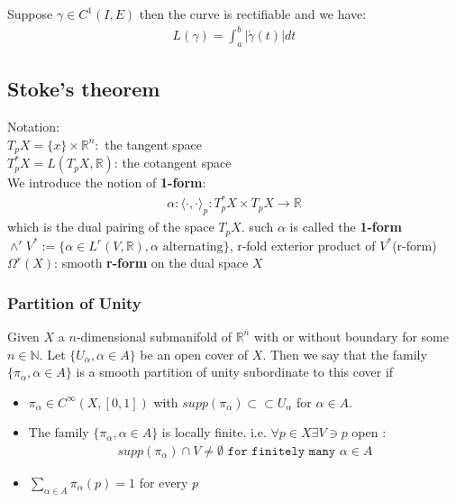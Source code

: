 \begin{theorem}
	Suppose $\gamma \in C^1(I, E)$ then the curve is rectifiable and we have:
	\begin{align*}
		L(\gamma) = \int_a^b |\dot{\gamma}(t)|dt
	\end{align*}
\end{theorem}


\subsection{Stoke's theorem}
Notation:\\
$T_pX = \{x\} \times \mathbb{R}^n:$ the tangent space\\
$T_p^*X = L(T_pX, \mathbb{R})$: the cotangent space\\
We introduce the notion of \textbf{1-form}:
\begin{align*}
	\alpha: \langle \cdot , \cdot  \rangle_p: T_p^*X \times T_pX \rightarrow \mathbb{R}
\end{align*}
which is the dual pairing of the space $T_pX$. such $\alpha$ is called the \textbf{1-form} \\
$\wedge^r V^*:= \big\{\alpha \in L^r (V, \mathbb{R}), \alpha \text{ alternating}\big\}$, r-fold exterior product of $V^*$(r-form)\\
$\Omega^r(X)$: smooth \textbf{r-form} on the dual space $X$

\subsubsection*{Partition of Unity}
\begin{definition}
	Given $X$ a $n$-dimensional submanifold of $\mathbb{R}^{\bar{n}}$ with or without boundary for some $n \in \mathbb{N}$. Let $\{U_\alpha, \alpha \in A\}$ be an open cover of $X$. Then we say that the family $\{\pi_\alpha, \alpha \in A\}$ is a smooth partition of unity subordinate to this cover if
	\begin{itemize}
		\item $\pi_\alpha \in C^\infty(X, [0, 1])$ with $supp(\pi_\alpha) \subset \subset U_\alpha$ for $\alpha \in A$.
		\item The family $\{\pi_\alpha, \alpha \in A\}$ is locally finite. i.e. $\forall p \in X \exists V \ni p$ open :
			\begin{align*}
				supp(\pi_\alpha) \cap V \neq \emptyset \texttt{ for finitely many } \alpha \in A
			\end{align*}
		\item $\sum_{\alpha \in A} \pi_\alpha(p) = 1$ for every $p$
	\end{itemize}
\end{definition}


